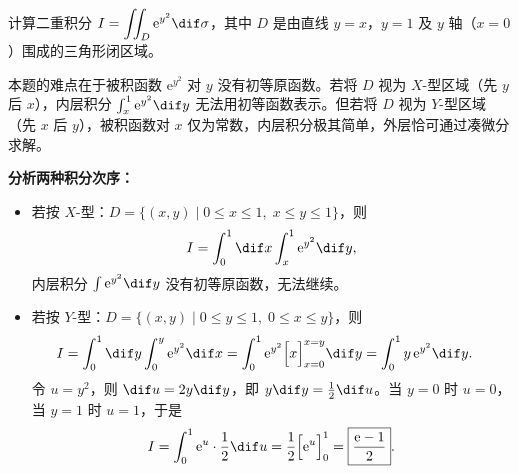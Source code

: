 \documentclass[answer]{THUExam}
\begin{document}
\vspace{0.8cm}

\begin{problem}
计算二重积分 $\displaystyle I=\iint_D \mathrm{e}^{y^2}\dif\sigma$，其中 $D$ 是由直线 $y=x$，$y=1$ 及 $y$ 轴（$x=0$）围成的三角形闭区域。
\end{problem}
\begin{note}
本题的难点在于被积函数 $\mathrm{e}^{y^2}$ 对 $y$ 没有初等原函数。若将 $D$ 视为 $X$-型区域（先 $y$ 后 $x$），内层积分 $\int_x^1\mathrm{e}^{y^2}\dif y$ 无法用初等函数表示。但若将 $D$ 视为 $Y$-型区域（先 $x$ 后 $y$），被积函数对 $x$ 仅为常数，内层积分极其简单，外层恰可通过凑微分求解。

\begin{center}
\end{center}
\end{note}
\begin{solution}
\textbf{分析两种积分次序：}
\begin{itemize}
    \item 若按 $X$-型：$D=\{(x,y)\mid 0\le x\le 1,\;x\le y\le 1\}$，则
    \[
    I = \int_0^1\dif x\int_x^1\mathrm{e}^{y^2}\dif y,
    \]
    内层积分 $\int\mathrm{e}^{y^2}\dif y$ 没有初等原函数，无法继续。
    \item 若按 $Y$-型：$D=\{(x,y)\mid 0\le y\le 1,\;0\le x\le y\}$，则
    \begin{align*}
    I &= \int_0^1\dif y\int_0^y\mathrm{e}^{y^2}\dif x
       = \int_0^1 \mathrm{e}^{y^2}\Bigl[x\Bigr]_{x=0}^{x=y}\dif y
       = \int_0^1 y\,\mathrm{e}^{y^2}\dif y.
    \end{align*}
    令 $u=y^2$，则 $\dif u=2y\dif y$，即 $y\dif y=\frac{1}{2}\dif u$。当 $y=0$ 时 $u=0$，当 $y=1$ 时 $u=1$，于是
    \[
    I = \int_0^1 \mathrm{e}^{u}\cdot\frac{1}{2}\dif u
       = \frac{1}{2}\Bigl[\mathrm{e}^{u}\Bigr]_0^1
       = \boxed{\dfrac{\mathrm{e}-1}{2}}.
    \]
\end{itemize}
\end{solution}
\end{document}
